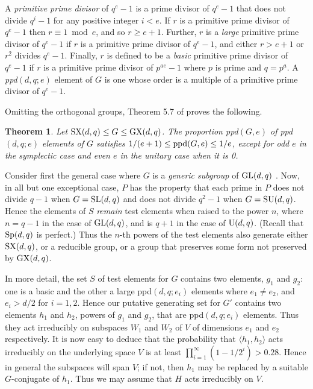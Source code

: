 \documentclass[12pt]{article}
\newtheorem{theorem}[definition]{Theorem}
\def\SL{{\rm SL}}
\def\GL{{\rm GL}}
\def\U{{\rm U}}
\def\Sp{{\rm Sp}}
\def\SU{{\rm SU}}
\def\SX{{\rm SX}}
\def\GX{{\rm GX}}
\begin{document}
A {\it primitive prime divisor} of $q^e-1$ is a prime divisor of
$q^e-1$ that does not divide $q^i-1$ for any positive integer $i<e$.  
If $r$ is a primitive prime divisor of $q^e-1$ then $r\equiv 1\bmod e$, 
and so $r\ge e+1$.  Further, $r$ is a {\it large} primitive prime divisor 
of $q^e-1$ if $r$ is a primitive prime divisor of $q^e-1$, and either 
$r>e+1$ or $r^2$ divides $q^e-1$.  Finally, $r$ is defined to be a {\it basic}
primitive prime divisor of $q^e-1$ if $r$ is a primitive prime divisor 
of $p^{ae}-1$ where $p$ is prime and $q=p^a$.  
A {\it ppd}$(d,q;e)$ element of $G$ is one whose order is 
a multiple of a primitive prime divisor of $q^e-1$. 

Omitting the orthogonal groups, Theorem 5.7 of \cite{NP} proves the following.
\begin{theorem}
Let $\SX(d,q)\le G\le\GX(d,q)$.
The proportion ppd$(G,e)$ of ppd$(d,q;e)$ elements
of $G$ satisfies $1/(e+1)\le {\rm ppd}(G,e)\le 1/e$, 
except for odd $e$ in the symplectic case 
and even $e$ in the unitary case when it is 0.
\end{theorem}

Consider first the general case where $G$ is a {\it generic subgroup} 
of $\GL(d, q)$ \cite[Definition 3.2]{NP}.
Now, in all but one exceptional case, $P$ has the property that 
each prime in $P$ does not divide $q - 1$
when $G = \SL(d, q)$ and does not divide $q^2 - 1$ when $G = \SU(d, q)$.
Hence the elements of $S$ {\it remain} test elements when raised to the 
power $n$, 
where $n=q-1$ in the case of $\GL(d,q)$, and is $q+1$ in 
the case of $\U(d,q)$.
(Recall that $\Sp(d, q)$ is perfect.)
Thus the $n$-th powers of the test elements also generate either 
$\SX(d,q)$, or a reducible group, or a group that preserves some 
form not preserved by $\GX(d,q)$.  

In more detail, the set $S$ of test elements for $G$ contains two 
elements, $g_1$ and $g_2$: 
one is a basic and the other a large 
ppd$(d,q;e_i)$ elements where $e_1\ne e_2$,
and $e_i>d/2$ for $i=1,2$.  Hence our putative generating set for $G'$ 
contains two elements $h_1$ and $h_2$, powers of $g_1$ and $g_2$, that are
ppd$(d,q;e_i)$ elements. Thus they act irreducibly on subspaces $W_1$ 
and $W_2$ of $V$ of dimensions $e_1$ and $e_2$ respectively.  
It is now easy to deduce that the probability that 
$\langle h_1, h_2 \rangle$ acts irreducibly on the underlying space
$V$ is at least $\prod_{i=1}^{\infty} (1 - 1/2^i) > 0.28$.
Hence in general the subspaces will span $V$; if not, 
then $h_1$ may be replaced by a suitable $G$-conjugate of $h_1$.
Thus we may assume that $H$ acts irreducibly on $V$.  
\end{document}
